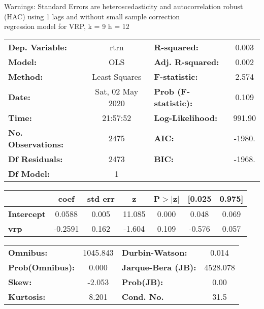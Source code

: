 Warnings: \newline
 [1] Standard Errors are heteroscedasticity and autocorrelation robust (HAC) using 1 lags and without small sample correction\\ 

regression model for VRP, k = 9 h = 12\begin{center}
\begin{tabular}{lclc}
\toprule
\textbf{Dep. Variable:}    &       rtrn       & \textbf{  R-squared:         } &     0.003   \\
\textbf{Model:}            &       OLS        & \textbf{  Adj. R-squared:    } &     0.002   \\
\textbf{Method:}           &  Least Squares   & \textbf{  F-statistic:       } &     2.574   \\
\textbf{Date:}             & Sat, 02 May 2020 & \textbf{  Prob (F-statistic):} &    0.109    \\
\textbf{Time:}             &     21:57:52     & \textbf{  Log-Likelihood:    } &    991.90   \\
\textbf{No. Observations:} &        2475      & \textbf{  AIC:               } &    -1980.   \\
\textbf{Df Residuals:}     &        2473      & \textbf{  BIC:               } &    -1968.   \\
\textbf{Df Model:}         &           1      & \textbf{                     } &             \\
\bottomrule
\end{tabular}
\begin{tabular}{lcccccc}
                   & \textbf{coef} & \textbf{std err} & \textbf{z} & \textbf{P$> |$z$|$} & \textbf{[0.025} & \textbf{0.975]}  \\
\midrule
\textbf{Intercept} &       0.0588  &        0.005     &    11.085  &         0.000        &        0.048    &        0.069     \\
\textbf{vrp}       &      -0.2591  &        0.162     &    -1.604  &         0.109        &       -0.576    &        0.057     \\
\bottomrule
\end{tabular}
\begin{tabular}{lclc}
\textbf{Omnibus:}       & 1045.843 & \textbf{  Durbin-Watson:     } &    0.014  \\
\textbf{Prob(Omnibus):} &   0.000  & \textbf{  Jarque-Bera (JB):  } & 4528.078  \\
\textbf{Skew:}          &  -2.053  & \textbf{  Prob(JB):          } &     0.00  \\
\textbf{Kurtosis:}      &   8.201  & \textbf{  Cond. No.          } &     31.5  \\
\bottomrule
\end{tabular}
\end{center}

